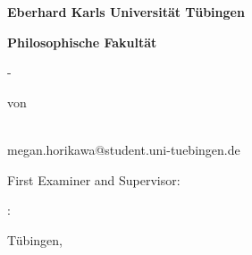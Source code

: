 \begin{titlepage}
{\centering
{\Large \textbf{Eberhard Karls Universität Tübingen}\par}
{\large \textbf{Philosophische Fakultät \fak} \par}
{\large \abschluss-\studiengang\par}
\vspace{1.75cm}
{\Large \textbf{\thesistitle}\par}
\vspace{1.5cm}
{\large \art \par}
\vspace{3cm}
{\large  von\par}
\vspace{1.25cm}
{\autor\\[3ex]
megan.horikawa@student.uni-tuebingen.de\\[3ex]
\par}}
\vfill
{\noindent First Examiner and Supervisor: \betreuerI 
\par \vspace{0.25cm}
\betreuerIItaetigkeit: \betreuerII
\par \vspace{0.75cm}
Tübingen, \zeitraum} %
\end{titlepage}